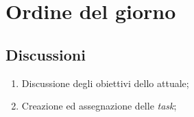 \section{Ordine del giorno} \label{sec:agenda}
\subsection{Discussioni} \label{subsec:discussione}
\begin{enumerate}
     \item Discussione degli obiettivi dello  attuale;
     \item Creazione ed assegnazione delle \emph{task};
\end{enumerate}


